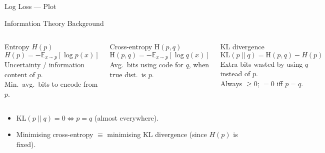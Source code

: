 \begin{frame}{Log Loss — Plot}
  \begin{center}
  \end{center}
\end{frame}

\begin{frame}{Information Theory Background}
  \begin{columns}[T]
    \begin{block}{Entropy $H(p)$}
      \[
        H(p) = -\mathbb{E}_{x\sim p}[\log p(x)]
      \]
      Uncertainty / information content of $p$.\\
      Min.\ avg.\ bits to encode from $p$.
    \end{block}
    \begin{block}{Cross-entropy $\mathrm{H}(p,q)$}
      \[
        \mathrm{H}(p,q) = -\mathbb{E}_{x\sim p}[\log q(x)]
      \]
      Avg.\ bits using code for $q$, when true dist.\ is $p$.
    \end{block}
    \begin{block}{KL divergence}
      \[
        \mathrm{KL}(p\|q) = \mathrm{H}(p,q)-H(p)
      \]
      Extra bits wasted by using $q$ instead of $p$.\\
      Always $\geq 0$; $=0$ iff $p=q$.
    \end{block}
  \end{columns}

  \vspace{.5em}
  \begin{itemize}
    \item $\mathrm{KL}(p\|q)=0 \Leftrightarrow p=q$ (almost everywhere).
    \item Minimising cross-entropy $\equiv$ minimising KL divergence (since $H(p)$ is fixed).
  \end{itemize}
\end{frame}

